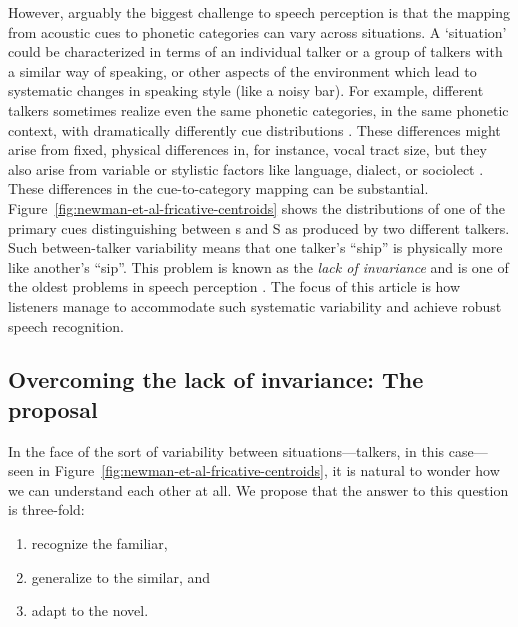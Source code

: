 \label{r3-environment-situation}
However, arguably the biggest challenge to speech perception is that the mapping from acoustic cues to phonetic categories can vary across situations. A `situation' could be characterized in terms of an individual talker or a group of talkers with a similar way of speaking, or other aspects of the environment which lead to systematic changes in speaking style (like a noisy bar). For example, different talkers sometimes realize even the same phonetic categories, in the same phonetic context, with dramatically differently cue distributions \autocite[e.g.,][]{Allen2003,McMurray2011a,Newman2001}.  These differences might arise from fixed, physical differences in, for instance, vocal tract size, but they also arise from variable or stylistic factors like language, dialect, or sociolect \autocite[e.g.,][]{Babel2014,Johnson2006,Labov1972,Pierrehumbert2003}.  These differences in the cue-to-category mapping can be substantial.
Figure~\ref{fig:newman-et-al-fricative-centroids} shows the distributions of one of the primary cues distinguishing between \ph s and \ph S as produced by two different talkers.  Such between-talker variability means that one talker's ``ship'' is physically more like another's ``sip''.
This problem is known as the \emph{lack of invariance} and is one of the oldest problems in speech perception \cite{Liberman1967}.
The focus of this article is how listeners manage to accommodate such systematic variability and achieve robust speech recognition.

\subsection{Overcoming the lack of invariance: The proposal}
\label{sec:overc-lack-invar}

In the face of the sort of variability between situations---talkers, in this case---seen in Figure~\ref{fig:newman-et-al-fricative-centroids}, it is natural to wonder how we can understand each other at all.  We propose that the answer to this question is three-fold:

\begin{enumerate}
\item recognize the familiar,
\item generalize to the similar, and
\item adapt to the novel.
\end{enumerate}

